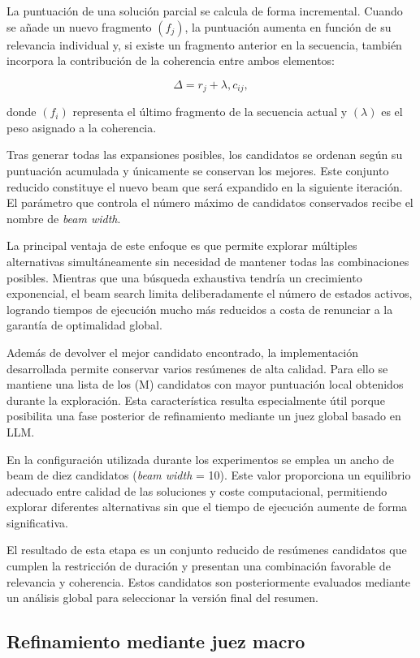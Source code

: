 \documentclass[12pt,a4paper]{article}
\begin{document}
La puntuación de una solución parcial se calcula de forma incremental. Cuando se añade un nuevo fragmento $(f_j)$, la puntuación aumenta en función de su relevancia individual y, si existe un fragmento anterior en la secuencia, también incorpora la contribución de la coherencia entre ambos elementos:

\[
\Delta =
r_j
+
\lambda , c_{ij},
\]

donde $(f_i)$ representa el último fragmento de la secuencia actual y $(\lambda)$ es el peso asignado a la coherencia.

Tras generar todas las expansiones posibles, los candidatos se ordenan según su puntuación acumulada y únicamente se conservan los mejores. Este conjunto reducido constituye el nuevo beam que será expandido en la siguiente iteración. El parámetro que controla el número máximo de candidatos conservados recibe el nombre de \textit{beam width}.

La principal ventaja de este enfoque es que permite explorar múltiples alternativas simultáneamente sin necesidad de mantener todas las combinaciones posibles. Mientras que una búsqueda exhaustiva tendría un crecimiento exponencial, el beam search limita deliberadamente el número de estados activos, logrando tiempos de ejecución mucho más reducidos a costa de renunciar a la garantía de optimalidad global.

Además de devolver el mejor candidato encontrado, la implementación desarrollada permite conservar varios resúmenes de alta calidad. Para ello se mantiene una lista de los (M) candidatos con mayor puntuación local obtenidos durante la exploración. Esta característica resulta especialmente útil porque posibilita una fase posterior de refinamiento mediante un juez global basado en LLM.

En la configuración utilizada durante los experimentos se emplea un ancho de beam de diez candidatos (\textit{beam width} = 10). Este valor proporciona un equilibrio adecuado entre calidad de las soluciones y coste computacional, permitiendo explorar diferentes alternativas sin que el tiempo de ejecución aumente de forma significativa.

El resultado de esta etapa es un conjunto reducido de resúmenes candidatos que cumplen la restricción de duración y presentan una combinación favorable de relevancia y coherencia. Estos candidatos son posteriormente evaluados mediante un análisis global para seleccionar la versión final del resumen.


\subsection{Refinamiento mediante juez macro}
\end{document}
